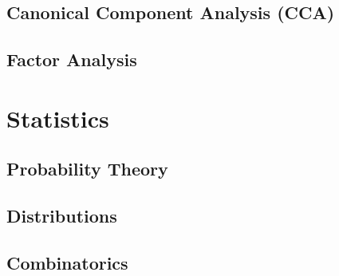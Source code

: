 \documentclass[11pt]{article}
\begin{document}
\subsection{Canonical Component Analysis (CCA)}
\subsection{Factor Analysis}

\section{Statistics}
\subsection{Probability Theory}
\subsection{Distributions}
\subsection{Combinatorics}
\end{document}
